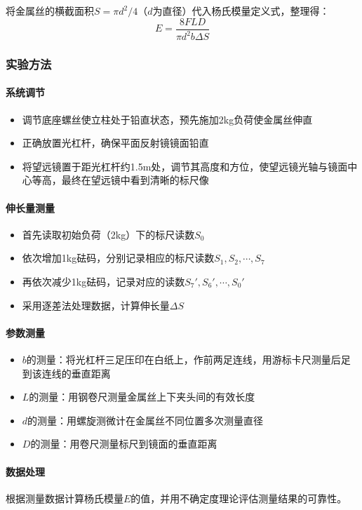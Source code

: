 \documentclass[]{../../templates/Report}%
\begin{document}
将金属丝的横截面积$S = \pi d^2/4$（$d$为直径）代入杨氏模量定义式，整理得：
\begin{equation}
E = \frac{8FLD}{\pi d^2 b \Delta S}
\end{equation}

\subsubsection{实验方法}
\paragraph{系统调节}
\begin{itemize}
\item 调节底座螺丝使立柱处于铅直状态，预先施加2kg负荷使金属丝伸直
\item 正确放置光杠杆，确保平面反射镜镜面铅直
\item 将望远镜置于距光杠杆约1.5m处，调节其高度和方位，使望远镜光轴与镜面中心等高，最终在望远镜中看到清晰的标尺像
\end{itemize}

\paragraph{伸长量测量}
\begin{itemize}
\item 首先读取初始负荷（2kg）下的标尺读数$S_0$
\item 依次增加1kg砝码，分别记录相应的标尺读数$S_1, S_2, \cdots, S_7$
\item 再依次减少1kg砝码，记录对应的读数$S_7', S_6', \cdots, S_0'$
\item 采用逐差法处理数据，计算伸长量$\Delta S$
\end{itemize}

\paragraph{参数测量}
\begin{itemize}
\item $b$的测量：将光杠杆三足压印在白纸上，作前两足连线，用游标卡尺测量后足到该连线的垂直距离
\item $L$的测量：用钢卷尺测量金属丝上下夹头间的有效长度
\item $d$的测量：用螺旋测微计在金属丝不同位置多次测量直径
\item $D$的测量：用卷尺测量标尺到镜面的垂直距离
\end{itemize}

\paragraph{数据处理}
根据测量数据计算杨氏模量$E$的值，并用不确定度理论评估测量结果的可靠性。
\end{document}
